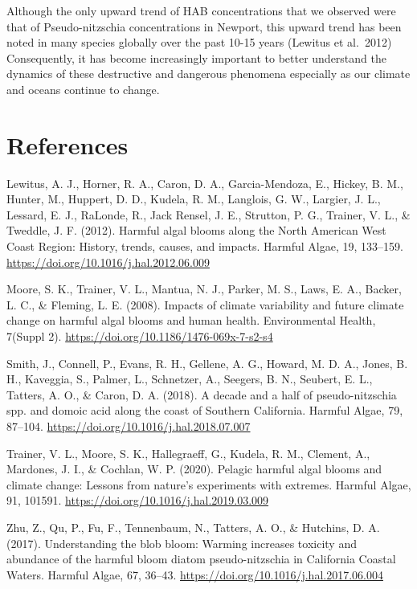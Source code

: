 \documentclass[
  12pt,
]{article}
\begin{document}
Although the only upward trend of HAB concentrations that we observed
were that of Pseudo-nitzschia concentrations in Newport, this upward
trend has been noted in many species globally over the past 10-15 years
(Lewitus et al.~2012) Consequently, it has become increasingly important
to better understand the dynamics of these destructive and dangerous
phenomena especially as our climate and oceans continue to change.

\hypertarget{references}{%
\section{References}\label{references}}

Lewitus, A. J., Horner, R. A., Caron, D. A., Garcia-Mendoza, E., Hickey,
B. M., Hunter, M., Huppert, D. D., Kudela, R. M., Langlois, G. W.,
Largier, J. L., Lessard, E. J., RaLonde, R., Jack Rensel, J. E.,
Strutton, P. G., Trainer, V. L., \& Tweddle, J. F. (2012). Harmful algal
blooms along the North American West Coast Region: History, trends,
causes, and impacts. Harmful Algae, 19, 133--159.
\url{https://doi.org/10.1016/j.hal.2012.06.009}

Moore, S. K., Trainer, V. L., Mantua, N. J., Parker, M. S., Laws, E. A.,
Backer, L. C., \& Fleming, L. E. (2008). Impacts of climate variability
and future climate change on harmful algal blooms and human health.
Environmental Health, 7(Suppl 2).
\url{https://doi.org/10.1186/1476-069x-7-s2-s4}

Smith, J., Connell, P., Evans, R. H., Gellene, A. G., Howard, M. D. A.,
Jones, B. H., Kaveggia, S., Palmer, L., Schnetzer, A., Seegers, B. N.,
Seubert, E. L., Tatters, A. O., \& Caron, D. A. (2018). A decade and a
half of pseudo-nitzschia spp. and domoic acid along the coast of
Southern California. Harmful Algae, 79, 87--104.
\url{https://doi.org/10.1016/j.hal.2018.07.007}

Trainer, V. L., Moore, S. K., Hallegraeff, G., Kudela, R. M., Clement,
A., Mardones, J. I., \& Cochlan, W. P. (2020). Pelagic harmful algal
blooms and climate change: Lessons from nature's experiments with
extremes. Harmful Algae, 91, 101591.
\url{https://doi.org/10.1016/j.hal.2019.03.009}

Zhu, Z., Qu, P., Fu, F., Tennenbaum, N., Tatters, A. O., \& Hutchins, D.
A. (2017). Understanding the blob bloom: Warming increases toxicity and
abundance of the harmful bloom diatom pseudo-nitzschia in California
Coastal Waters. Harmful Algae, 67, 36--43.
\url{https://doi.org/10.1016/j.hal.2017.06.004}
\end{document}
